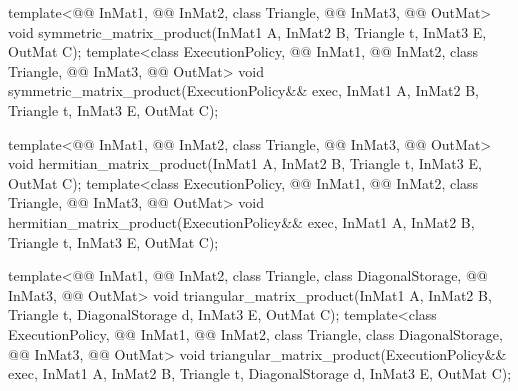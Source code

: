 %
\begin{itemdecl}
template<@@ InMat1, @@ InMat2, class Triangle, @@ InMat3,
         @@ OutMat>
  void symmetric_matrix_product(InMat1 A, InMat2 B, Triangle t, InMat3 E, OutMat C);
template<class ExecutionPolicy,
         @@ InMat1, @@ InMat2, class Triangle, @@ InMat3,
         @@ OutMat>
  void symmetric_matrix_product(ExecutionPolicy&& exec,
                                InMat1 A, InMat2 B, Triangle t, InMat3 E, OutMat C);

template<@@ InMat1, @@ InMat2, class Triangle, @@ InMat3,
         @@ OutMat>
  void hermitian_matrix_product(InMat1 A, InMat2 B, Triangle t, InMat3 E, OutMat C);
template<class ExecutionPolicy,
         @@ InMat1, @@ InMat2, class Triangle, @@ InMat3,
         @@ OutMat>
  void hermitian_matrix_product(ExecutionPolicy&& exec,
                                InMat1 A, InMat2 B, Triangle t, InMat3 E, OutMat C);

template<@@ InMat1, @@ InMat2, class Triangle, class DiagonalStorage,
         @@ InMat3, @@ OutMat>
  void triangular_matrix_product(InMat1 A, InMat2 B, Triangle t, DiagonalStorage d, InMat3 E,
                                 OutMat C);
template<class ExecutionPolicy,
         @@ InMat1, @@ InMat2, class Triangle, class DiagonalStorage,
         @@ InMat3, @@ OutMat>
  void triangular_matrix_product(ExecutionPolicy&& exec,
                                 InMat1 A, InMat2 B, Triangle t, DiagonalStorage d, InMat3 E,
                                 OutMat C);
\end{itemdecl}

